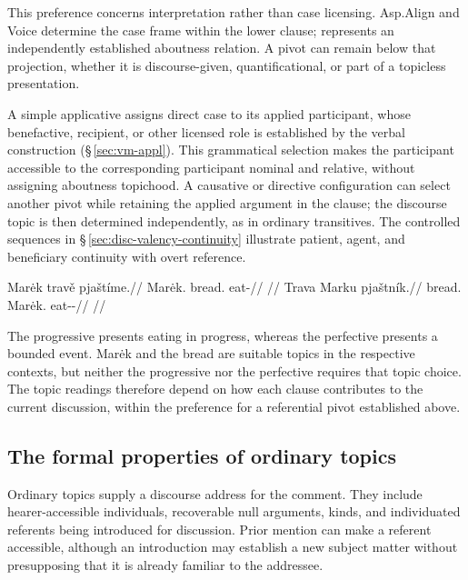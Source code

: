 \noindent This preference concerns interpretation rather than case licensing.
 Asp.Align and Voice determine the case frame within the lower clause;
  represents an independently established aboutness relation.
 A pivot can remain below that projection, whether it is discourse-given,
 quantificational, or part of a topicless presentation.

A simple applicative assigns direct case to its applied participant, whose
benefactive, recipient, or other licensed role is established by the verbal
construction (§\,\ref{sec:vm-appl}). This grammatical selection makes the
participant accessible to the corresponding participant nominal and relative,
without assigning aboutness topichood. A causative or directive configuration
can select another pivot while retaining the applied argument in the clause;
the discourse topic is then determined independently, as in ordinary
transitives. The controlled sequences in §\,\ref{sec:disc-valency-continuity}
illustrate patient, agent, and beneficiary continuity with overt reference.

\pex\label{ex:tc-aspect-topic}
\a
\begingl
\gla Marėk travě pjaštíme.//
\glb Marėk.\Dir{} bread.\Ind{} eat-\Prog{}//
\glft {}
      //
\endgl
\a
\begingl
\gla Trava Marku pjaštník.//
\glb bread.\Dir{} Marėk.\Trs{} eat-\Trs{}-\Pf{}//
\glft {}
      //
\endgl
\xe

\noindent The progressive presents eating in progress, whereas the perfective
 presents a bounded event. Marėk and the bread are suitable topics in the
 respective contexts, but neither the progressive nor the perfective requires
 that topic choice. The topic readings therefore depend on how each clause
 contributes to the current discussion, within the preference for a
 referential pivot established above.

\subsection{The formal properties of ordinary topics}
\label{sec:tc-ordinary-topics}

Ordinary topics supply a discourse address for the comment. They include
 hearer-accessible individuals, recoverable null arguments, kinds, and
 individuated referents being introduced for discussion. Prior mention can
 make a referent accessible, although an introduction may establish a new subject matter without presupposing that it is already
 familiar to the addressee.

